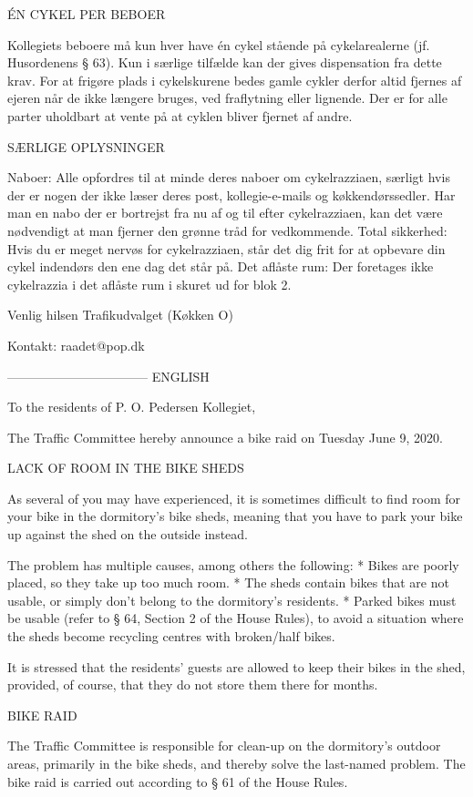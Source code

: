 ÉN CYKEL PER BEBOER

Kollegiets beboere må kun hver have én cykel stående på cykelarealerne (jf. Husordenens § 63). Kun i særlige tilfælde kan der gives dispensation fra dette krav. For at frigøre plads i cykelskurene bedes gamle cykler derfor altid fjernes af ejeren når de ikke længere bruges, ved fraflytning eller lignende. Der er for alle parter uholdbart at vente på at cyklen bliver fjernet af andre.


SÆRLIGE OPLYSNINGER

Naboer: Alle opfordres til at minde deres naboer om cykelrazziaen, særligt hvis der er nogen der ikke læser deres post, kollegie-e-mails og køkkendørssedler. Har man en nabo der er bortrejst fra nu af og til efter cykelrazziaen, kan det være nødvendigt at man fjerner den grønne tråd for vedkommende.
Total sikkerhed: Hvis du er meget nervøs for cykelrazziaen, står det dig frit for at opbevare din cykel indendørs den ene dag det står på.
Det aflåste rum: Der foretages ikke cykelrazzia i det aflåste rum i skuret ud for blok 2.

Venlig hilsen
Trafikudvalget (Køkken O)

Kontakt: raadet@pop.dk


---------------------------------
ENGLISH

To the residents of P. O. Pedersen Kollegiet,

The Traffic Committee hereby announce a bike raid on Tuesday June 9, 2020.


LACK OF ROOM IN THE BIKE SHEDS

As several of you may have experienced, it is sometimes difficult to find room for your bike in the dormitory's bike sheds, meaning that you have to park your bike up against the shed on the outside instead.

The problem has multiple causes, among others the following:
* Bikes are poorly placed, so they take up too much room.
* The sheds contain bikes that are not usable, or simply don’t belong to the dormitory’s residents.
* Parked bikes must be usable (refer to § 64, Section 2 of the House Rules), to avoid a situation where the sheds become recycling centres with broken/half bikes.

It is stressed that the residents' guests are allowed to keep their bikes in the shed, provided, of course, that they do not store them there for months.


BIKE RAID

The Traffic Committee is responsible for clean-up on the dormitory's outdoor areas, primarily in the bike sheds, and thereby solve the last-named problem. The bike raid is carried out according to § 61 of the House Rules.

